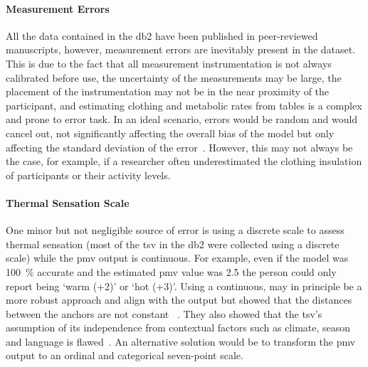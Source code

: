 \paragraph{Measurement Errors}
All the data contained in the \ac{db2} have been published in peer-reviewed manuscripts, however, measurement errors are inevitably present in the dataset.
This is due to the fact that all measurement instrumentation is not always calibrated before use, the uncertainty of the measurements may be large, the placement of the instrumentation may not be in the near proximity of the participant, and estimating clothing and metabolic rates from tables is a complex and prone to error task.
In an ideal scenario, errors would be random and would cancel out, not significantly affecting the overall bias of the model but only affecting the standard deviation of the error~\cite{Humphreys2002}.
However, this may not always be the case, for example, if a researcher often underestimated the clothing insulation of participants or their activity levels.

\paragraph{Thermal Sensation Scale}
One minor but not negligible source of error is using a discrete scale to assess thermal sensation (most of the \ac{tsv} in the \ac{db2} were collected using a discrete scale) while the \ac{pmv} output is continuous.
For example, even if the model was 100~\% accurate and the estimated \ac{pmv} value was \num{2.5} the person could only report being `warm (+2)' or `hot (+3)'.
Using a continuous, may in principle be a more robust approach and align with the output but  showed that the distances between the anchors are not constant ~\cite{schweiker2019scales, schweiker2020evaluating}. 
They also showed that the \ac{tsv}'s assumption of its independence from contextual factors such as climate, season and language is flawed~\cite{schweiker2019scales, schweiker2020evaluating}.
An alternative solution would be to transform the \ac{pmv} output to an ordinal and categorical seven-point scale. 


